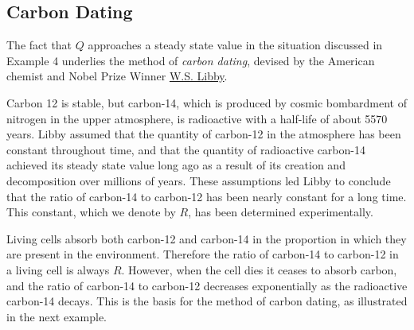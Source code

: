 \documentclass{ximera}
\begin{document}


\subsection*{Carbon Dating}

The fact that $Q$ approaches a steady state value in the
situation discussed in Example 4 underlies the method of \textit{carbon dating}, devised by the American chemist and Nobel Prize Winner
\href{https://en.wikipedia.org/wiki/Willard_Libby}{W.S. Libby}.

Carbon 12 is stable, but carbon-14, which is produced by cosmic
bombardment of nitrogen in the upper atmosphere, is radioactive with a
half-life of about 5570 years. Libby assumed that the
quantity
of carbon-12 in the atmosphere has been constant throughout time, and
that the quantity of radioactive carbon-14 achieved its steady state
value long ago as a result of its creation and decomposition over
millions of years. These assumptions led Libby to conclude that the
ratio of carbon-14 to carbon-12 has been nearly constant for a long
time. This constant, which we denote by $R$, has been determined
experimentally.

Living cells absorb both carbon-12 and carbon-14 in the proportion in
which they are present in the environment. Therefore the ratio of
carbon-14 to carbon-12 in a living cell is always $R$. However, when
the cell dies it ceases to absorb carbon, and the ratio of carbon-14
to carbon-12 decreases exponentially as the radioactive carbon-14
decays. This is the basis for the method of carbon dating, as
illustrated in the next example.
\end{document}
